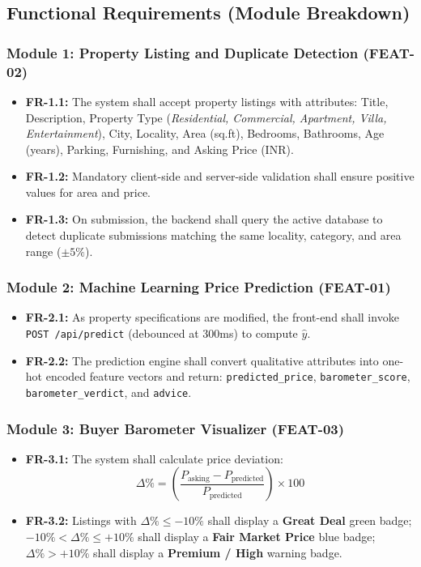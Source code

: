 \documentclass[11pt,a4paper]{article}
\begin{document}
\subsection{Functional Requirements (Module Breakdown)}

\subsubsection{Module 1: Property Listing and Duplicate Detection (FEAT-02)}
\begin{itemize}[leftmargin=0.8cm]
    \item \textbf{FR-1.1:} The system shall accept property listings with attributes: Title, Description, Property Type (\textit{Residential, Commercial, Apartment, Villa, Entertainment}), City, Locality, Area (sq.ft), Bedrooms, Bathrooms, Age (years), Parking, Furnishing, and Asking Price (INR).
    \item \textbf{FR-1.2:} Mandatory client-side and server-side validation shall ensure positive values for area and price.
    \item \textbf{FR-1.3:} On submission, the backend shall query the active database to detect duplicate submissions matching the same locality, category, and area range ($\pm 5\%$).
\end{itemize}

\subsubsection{Module 2: Machine Learning Price Prediction (FEAT-01)}
\begin{itemize}[leftmargin=0.8cm]
    \item \textbf{FR-2.1:} As property specifications are modified, the front-end shall invoke \texttt{POST /api/predict} (debounced at 300ms) to compute $\hat{y}$.
    \item \textbf{FR-2.2:} The prediction engine shall convert qualitative attributes into one-hot encoded feature vectors and return: \texttt{predicted\_price}, \texttt{barometer\_score}, \texttt{barometer\_verdict}, and \texttt{advice}.
\end{itemize}

\subsubsection{Module 3: Buyer Barometer Visualizer (FEAT-03)}
\begin{itemize}[leftmargin=0.8cm]
    \item \textbf{FR-3.1:} The system shall calculate price deviation:
    $$\Delta\% = \left(\frac{P_{\text{asking}} - P_{\text{predicted}}}{P_{\text{predicted}}}\right) \times 100$$
    \item \textbf{FR-3.2:} Listings with $\Delta\% \le -10\%$ shall display a \textbf{Great Deal} green badge; $-10\% < \Delta\% \le +10\%$ shall display a \textbf{Fair Market Price} blue badge; $\Delta\% > +10\%$ shall display a \textbf{Premium / High} warning badge.
\end{itemize}
\end{document}
